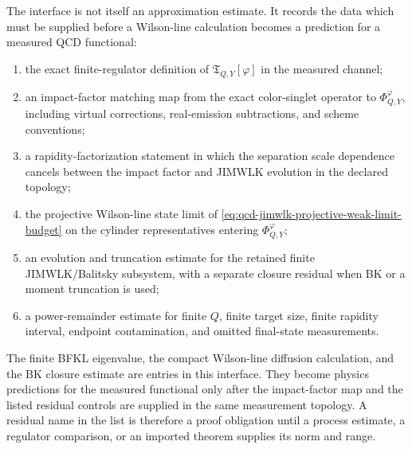 \begin{remark}
The interface is not itself an approximation estimate.  It records the data
which must be supplied before a Wilson-line calculation becomes a prediction
for a measured QCD functional:
\begin{enumerate}
  \item the exact finite-regulator definition of
  \(\mathfrak T_{Q,Y}[\varphi]\) in the measured channel;
  \item an impact-factor matching map from the exact color-singlet operator to
  \(\Phi^\varphi_{Q,Y}\), including virtual corrections, real-emission
  subtractions, and scheme conventions;
  \item a rapidity-factorization statement in which the separation scale
  dependence cancels between the impact factor and JIMWLK evolution in the
  declared topology;
  \item the projective Wilson-line state limit of
  \eqref{eq:qcd-jimwlk-projective-weak-limit-budget} on the cylinder
  representatives entering \(\Phi^\varphi_{Q,Y}\);
  \item an evolution and truncation estimate for the retained finite
  JIMWLK/Balitsky subsystem, with a separate closure residual when BK or a
  moment truncation is used;
  \item a power-remainder estimate for finite \(Q\), finite target size,
  finite rapidity interval, endpoint contamination, and omitted final-state
  measurements.
\end{enumerate}
The finite BFKL eigenvalue, the compact Wilson-line diffusion calculation, and
the BK closure estimate are entries in this interface.  They become physics
predictions for the measured functional only after the impact-factor map and
the listed residual controls are supplied in the same measurement topology.  A
residual name in the list is therefore a proof obligation until a process
estimate, a regulator comparison, or an imported theorem supplies its norm and
range.
\end{remark}

